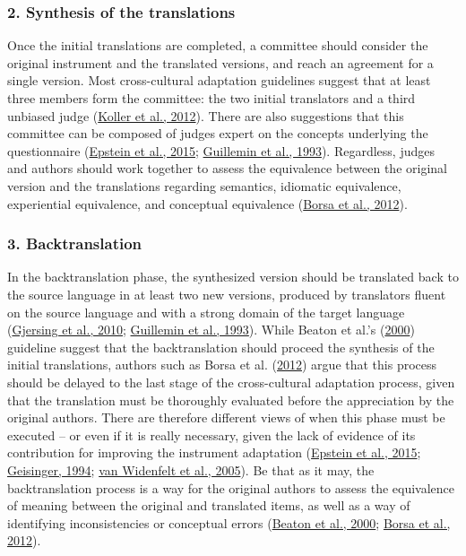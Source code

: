 \documentclass[
  ,doc,11pt, twoside,floatsintext]{apa6}
\begin{document}
\hypertarget{synthesis-of-the-translations}{%
\subsubsection{2. Synthesis of the translations}\label{synthesis-of-the-translations}}

Once the initial translations are completed, a committee should consider the original instrument and the translated versions, and reach an agreement for a single version. Most cross-cultural adaptation guidelines suggest that at least three members form the committee: the two initial translators and a third unbiased judge (\protect\hyperlink{ref-koller2012}{Koller et al., 2012}). There are also suggestions that this committee can be composed of judges expert on the concepts underlying the questionnaire (\protect\hyperlink{ref-epstein2015}{Epstein et al., 2015}; \protect\hyperlink{ref-guillemin1993}{Guillemin et al., 1993}). Regardless, judges and authors should work together to assess the equivalence between the original version and the translations regarding semantics, idiomatic equivalence, experiential equivalence, and conceptual equivalence (\protect\hyperlink{ref-borsaAdaptacaoValidacaoInstrumentos2012}{Borsa et al., 2012}).

\hypertarget{backtranslation}{%
\subsubsection{3. Backtranslation}\label{backtranslation}}

In the backtranslation phase, the synthesized version should be translated back to the source language in at least two new versions, produced by translators fluent on the source language and with a strong domain of the target language (\protect\hyperlink{ref-gjersing2010}{Gjersing et al., 2010}; \protect\hyperlink{ref-guillemin1993}{Guillemin et al., 1993}). While Beaton et al.'s (\protect\hyperlink{ref-beaton2000}{2000}) guideline suggest that the backtranslation should proceed the synthesis of the initial translations, authors such as Borsa et al. (\protect\hyperlink{ref-borsaAdaptacaoValidacaoInstrumentos2012}{2012}) argue that this process should be delayed to the last stage of the cross-cultural adaptation process, given that the translation must be thoroughly evaluated before the appreciation by the original authors. There are therefore different views of when this phase must be executed -- or even if it is really necessary, given the lack of evidence of its contribution for improving the instrument adaptation (\protect\hyperlink{ref-epstein2015}{Epstein et al., 2015}; \protect\hyperlink{ref-geisinger1994}{Geisinger, 1994}; \protect\hyperlink{ref-vanwidenfelt2005}{van Widenfelt et al., 2005}). Be that as it may, the backtranslation process is a way for the original authors to assess the equivalence of meaning between the original and translated items, as well as a way of identifying inconsistencies or conceptual errors (\protect\hyperlink{ref-beaton2000}{Beaton et al., 2000}; \protect\hyperlink{ref-borsaAdaptacaoValidacaoInstrumentos2012}{Borsa et al., 2012}).
\end{document}
